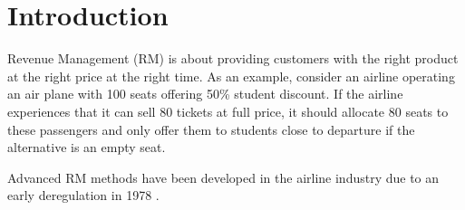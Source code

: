 \section{Introduction}

Revenue Management (RM) is about providing customers with the right product at the right price at the right time. As an example, consider an airline operating an air plane with 100 seats offering 50\% student discount. If the airline experiences that it can sell 80 tickets at full price, it should allocate 80 seats to these passengers and only offer them to students close to departure if the alternative is an empty seat.

Advanced RM methods have been developed in the airline industry due to an early deregulation in 1978 \cite{Act78}.    